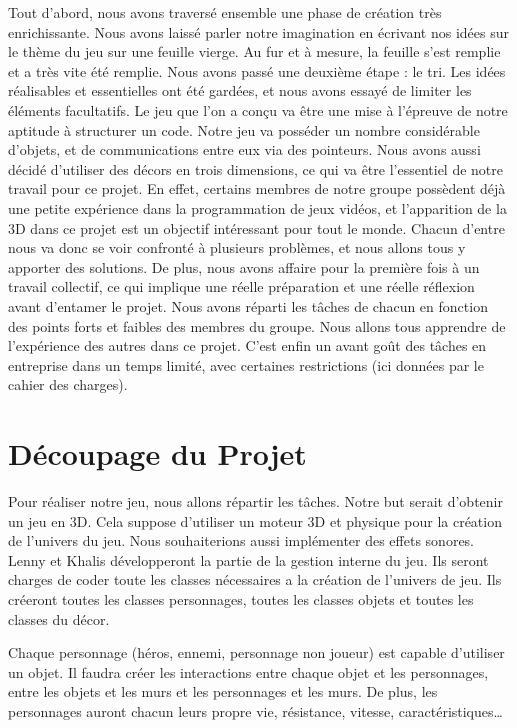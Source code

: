 \documentclass{report}
\begin{document}
 Tout d'abord, nous avons traversé ensemble une phase de création très enrichissante. Nous avons laissé parler notre imagination en écrivant nos idées sur le thème du jeu sur une feuille vierge. Au fur et à mesure, la feuille s'est remplie et a très vite été remplie. Nous avons passé une deuxième étape : le tri. Les idées réalisables et essentielles ont été gardées, et nous avons essayé de limiter les éléments facultatifs. Le jeu que l'on a conçu va être une mise à l'épreuve de notre aptitude à structurer un code. Notre jeu va posséder un nombre considérable d'objets, et de communications entre eux via des pointeurs. Nous avons aussi décidé d'utiliser des décors en trois dimensions, ce qui va être l'essentiel de notre travail pour ce projet. En effet, certains membres de notre groupe possèdent déjà une petite expérience dans la programmation de jeux vidéos, et l'apparition de la 3D dans ce projet est un objectif intéressant pour tout le monde. Chacun d'entre nous va donc se voir confronté à plusieurs problèmes, et nous allons tous y apporter des solutions. De plus, nous avons affaire pour la première fois à un travail collectif, ce qui implique une réelle préparation et une réelle réflexion avant d'entamer le projet. Nous avons réparti les tâches de chacun en fonction des points forts et faibles des membres du groupe. Nous allons tous apprendre de l'expérience des autres dans ce projet. C'est enfin un avant goût des tâches en entreprise dans un temps limité, avec certaines restrictions (ici données par le cahier des charges).

\newpage

\section[Découpage du Projet]{Découpage du Projet}

Pour réaliser notre jeu, nous allons répartir les tâches. Notre but serait d'obtenir un jeu en 3D. Cela suppose d'utiliser un moteur 3D et physique pour la création de l'univers du jeu. Nous souhaiterions aussi implémenter des effets sonores. \\

Lenny et Khalis développeront la partie de la gestion interne du jeu. Ils seront charges de coder toute les classes nécessaires a la création de l'univers de jeu. Ils créeront toutes les classes personnages, toutes les classes objets et toutes les classes du décor. 

Chaque personnage (héros, ennemi, personnage non joueur) est capable d'utiliser un objet. Il faudra créer les interactions entre chaque objet et les personnages, entre les objets et les murs et les personnages et les murs. De plus, les personnages auront chacun leurs propre vie, résistance, vitesse, caractéristiques\ldots\\
\end{document}
